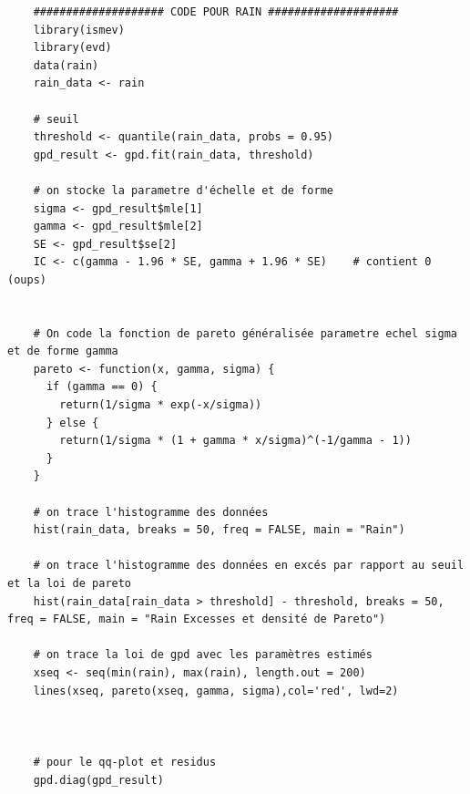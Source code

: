 \documentclass{article}
\begin{document}
\begin{lstlisting}
	#################### CODE POUR RAIN ####################
	library(ismev)
	library(evd)
	data(rain)
	rain_data <- rain

	# seuil	
	threshold <- quantile(rain_data, probs = 0.95)
	gpd_result <- gpd.fit(rain_data, threshold)

	# on stocke la parametre d'échelle et de forme
	sigma <- gpd_result$mle[1]
	gamma <- gpd_result$mle[2]
	SE <- gpd_result$se[2]
	IC <- c(gamma - 1.96 * SE, gamma + 1.96 * SE)    # contient 0 (oups)


	# On code la fonction de pareto généralisée parametre echel sigma et de forme gamma
	pareto <- function(x, gamma, sigma) {
	  if (gamma == 0) {
		return(1/sigma * exp(-x/sigma))
	  } else {
		return(1/sigma * (1 + gamma * x/sigma)^(-1/gamma - 1))
	  }
	}

	# on trace l'histogramme des données
	hist(rain_data, breaks = 50, freq = FALSE, main = "Rain")

	# on trace l'histogramme des données en excés par rapport au seuil et la loi de pareto
	hist(rain_data[rain_data > threshold] - threshold, breaks = 50, freq = FALSE, main = "Rain Excesses et densité de Pareto")

	# on trace la loi de gpd avec les paramètres estimés
	xseq <- seq(min(rain), max(rain), length.out = 200)
	lines(xseq, pareto(xseq, gamma, sigma),col='red', lwd=2)



	# pour le qq-plot et residus
	gpd.diag(gpd_result)

\end{lstlisting}
\end{document}
